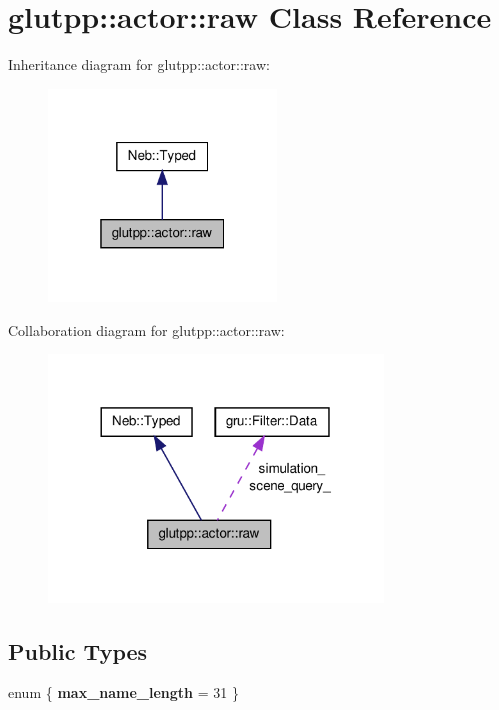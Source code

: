 \hypertarget{classglutpp_1_1actor_1_1raw}{\section{glutpp\-:\-:actor\-:\-:raw \-Class \-Reference}
\label{classglutpp_1_1actor_1_1raw}
}


\-Inheritance diagram for glutpp\-:\-:actor\-:\-:raw\-:
\nopagebreak
\begin{figure}[H]
\begin{center}
\leavevmode
\includegraphics[width=172pt]{classglutpp_1_1actor_1_1raw__inherit__graph}
\end{center}
\end{figure}


\-Collaboration diagram for glutpp\-:\-:actor\-:\-:raw\-:
\nopagebreak
\begin{figure}[H]
\begin{center}
\leavevmode
\includegraphics[width=252pt]{classglutpp_1_1actor_1_1raw__coll__graph}
\end{center}
\end{figure}
\subsection*{\-Public \-Types}
\begin{DoxyCompactItemize}
\item 
enum \{ {\bfseries max\-\_\-name\-\_\-length} =  31
 \}
\end{DoxyCompactItemize}

